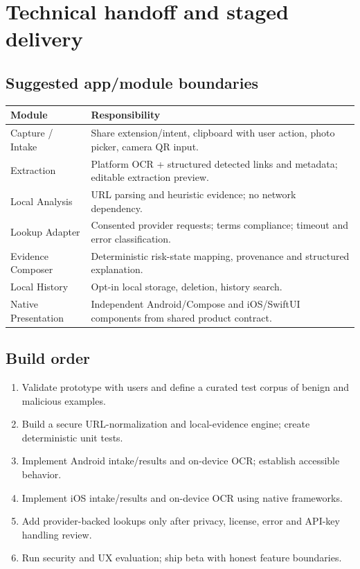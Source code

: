 \documentclass[10pt,a4paper]{article}
\begin{document}
\section{Technical handoff and staged delivery}
\subsection{Suggested app/module boundaries}
\begin{tabularx}{\linewidth}{@{}p{44mm}Y@{}}\toprule
\textbf{Module} & \textbf{Responsibility} \\ \midrule
Capture / Intake & Share extension/intent, clipboard with user action, photo picker, camera QR input. \\
Extraction & Platform OCR + structured detected links and metadata; editable extraction preview. \\
Local Analysis & URL parsing and heuristic evidence; no network dependency. \\
Lookup Adapter & Consented provider requests; terms compliance; timeout and error classification. \\
Evidence Composer & Deterministic risk-state mapping, provenance and structured explanation. \\
Local History & Opt-in local storage, deletion, history search. \\
Native Presentation & Independent Android/Compose and iOS/SwiftUI components from shared product contract. \\
\bottomrule\end{tabularx}
\subsection{Build order}
\begin{enumerate}
\item Validate prototype with users and define a curated test corpus of benign and malicious examples.
\item Build a secure URL-normalization and local-evidence engine; create deterministic unit tests.
\item Implement Android intake/results and on-device OCR; establish accessible behavior.
\item Implement iOS intake/results and on-device OCR using native frameworks.
\item Add provider-backed lookups only after privacy, license, error and API-key handling review.
\item Run security and UX evaluation; ship beta with honest feature boundaries.
\end{enumerate}
\end{document}
